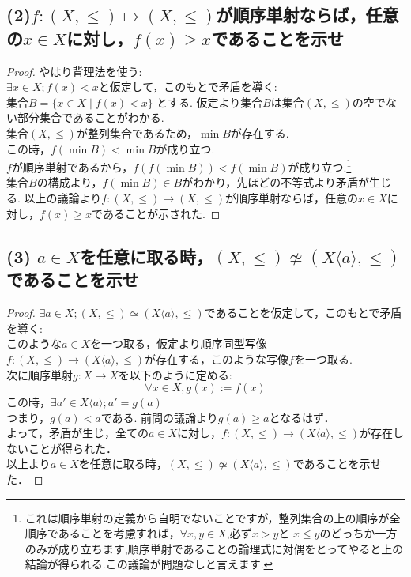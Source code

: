 \documentclass{jreport}
\begin{document}
\subsection{\normalsize{(2)$f : (X, \le) \mapsto (X, \le) $が順序単射ならば，任意の$x \in X$に対し，$f(x) \ge x$であることを示せ}}
\begin{proof}
  やはり背理法を使う:\\
  $\exists x \in X ; f(x) < x$と仮定して，このもとで矛盾を導く:\\
  集合$B = \{ x \in X \mid f(x)<x \} $ とする. 仮定より集合$B$は集合$(X, \le)$の空でない部分集合であることがわかる.\\
  集合$(X, \le)$が整列集合であるため，$\min B$が存在する. \\
  この時，$ f( \min B ) <  \min B$が成り立つ.\\
  $f$が順序単射であるから，$f(f( \min B )) < f(\min B)$が成り立つ.\footnote{これは順序単射の定義から自明でないことですが，整列集合の上の順序が全順序であることを考慮すれば，$\forall x,y \in X$,必ず$x>y$と
  $x \le y$のどっちか一方のみが成り立ちます,順序単射であることの論理式に対偶をとってやると上の結論が得られる.この議論が問題なしと言えます.
  }\\
  集合$B$の構成より，$f( \min B) \in B$がわかり，先ほどの不等式より矛盾が生じる.
以上の議論より$f : (X, \le) \to (X, \le) $が順序単射ならば，任意の$x \in X$に対し，$f(x) \ge x$であることが示された.
\end{proof}
\newpage
\subsection{\normalsize{(3) $ a \in X$を任意に取る時，$(X,\le) \not\simeq (X \langle a \rangle , \le)$であることを示せ}}
\begin{proof}
$\exists a \in X ; (X,\le) \simeq (X \langle a \rangle , \le)$であることを仮定して，このもとで矛盾を導く:\\
このような$a \in X$を一つ取る，仮定より順序同型写像$f:(X,\le) \to  (X \langle a \rangle , \le)$が存在する，このような写像$f$を一つ取る.\\
次に順序単射$g : X \to X$を以下のように定める:
$$
	\forall x \in X, g(x) := f(x)
$$
この時，$\exists a' \in X\langle a \rangle ; a' = g(a)$ \\
つまり，$ g(a) <   a$である. 前問の議論より$g(a) \ge a$となるはず．\\
よって，矛盾が生じ，全ての$a \in X$に対し，$f:(X,\le) \to  (X \langle a \rangle , \le)$が存在しないことが得られた．\\
以上より$ a \in X$を任意に取る時，$(X,\le) \not\simeq (X \langle a \rangle , \le)$であることを示せた．
\end{proof}
\newpage
\end{document}

